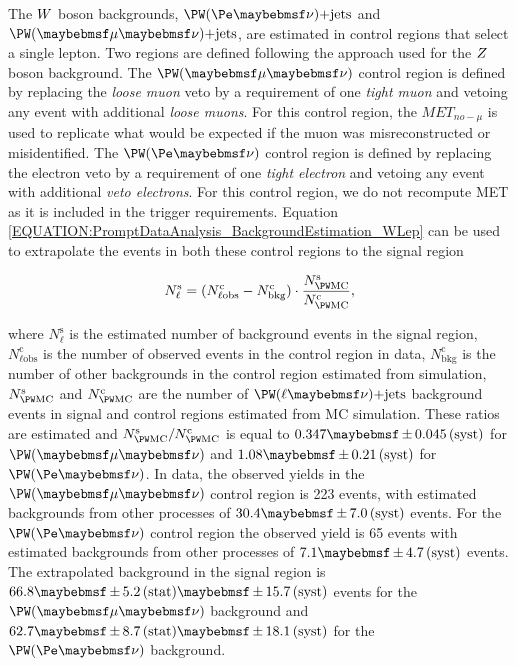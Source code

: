 The $W$ boson backgrounds, $\PW (\Pe \nu)\text{+jets}$ and $\PW (\mu \nu)\text{+jets}$, are estimated in control regions that select a single lepton. Two regions are defined following the approach used for the $Z$ boson background. The $\PW (\mu \nu)$ control region is defined by replacing the \textit{loose muon} veto by a requirement of one \textit{tight muon} and vetoing any event with additional \textit{loose muons}. For this control region, the $MET_{no-\mu}$ is used to replicate what would be expected if the muon was misreconstructed or misidentified. The $\PW (\Pe \nu)$ control region is defined by replacing the electron veto by a requirement of one \textit{tight electron} and vetoing any event with additional \textit{veto electrons}. For this control region, we do not recompute \gls{MET} as it is included in the trigger requirements. Equation \ref{EQUATION:PromptDataAnalysis_BackgroundEstimation_WLep} can be used to extrapolate the events in both these control regions to the signal region

\begin{equation}
N^\mathrm{s}_\ell = (N^\mathrm{c}_{\ell\text{obs}} - N^\mathrm{c}_\text{bkg}) \cdot \frac{N^\mathrm{s}_{\PW \mathrm{MC}}}{N^\mathrm{c}_{\PW \mathrm{MC}}},
\label{EQUATION:PromptDataAnalysis_BackgroundEstimation_WLep}
\end{equation}

where $N^\mathrm{s}_\ell$ is the estimated number of background events in the signal region, $N^\mathrm{c}_{\ell\text{obs}}$ is the number of observed events in the control region in data, $N^\mathrm{c}_\text{bkg}$ is the number of other backgrounds in the control region estimated from simulation, $N^\mathrm{s}_{\PW \mathrm{MC}}$ and $N^\mathrm{c}_{\PW \mathrm{MC}}$  are the number of $\PW (\ell \nu)\text{+jets}$ background events in signal and control regions estimated from \gls{MC} simulation. These ratios are estimated and $N^\mathrm{s}_{\PW \mathrm{MC}}/N^\mathrm{c}_{\PW \mathrm{MC}}$ is equal to $0.347 \pm 0.045\syst$ for $\PW (\mu \nu)$ and $1.08 \pm 0.21\syst$ for $\PW (\Pe \nu)$. In data, the observed yields in the $\PW (\mu \nu)$ control region is 223 events, with estimated backgrounds from other processes of $30.4 \pm 7.0\syst$ events. For the $\PW (\Pe \nu)$ control region the observed yield is 65 events with estimated backgrounds from other processes of $7.1 \pm 4.7\syst$ events. The  extrapolated background in the signal region is $66.8 \pm 5.2\stat \pm 15.7\syst$ events for the $\PW (\mu \nu)$ background and  $62.7 \pm 8.7\stat \pm 18.1\syst$ for the $\PW (\Pe \nu)$ background.

